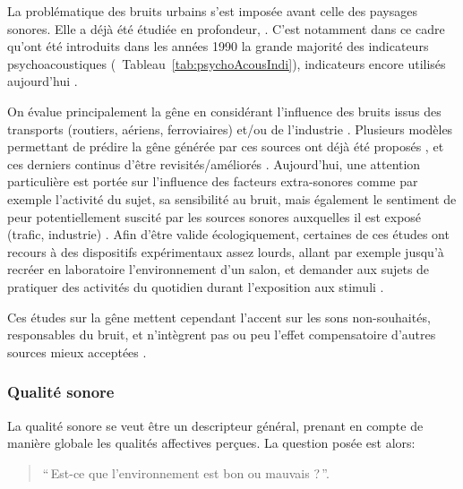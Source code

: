 {La problématique des bruits urbains s'est imposée avant celle des paysages sonores. Elle a déjà été étudiée en profondeur, \citep{marquis2005noisea,marquis2005noiseb}. C'est notamment dans ce cadre qu'ont été introduits dans les années 1990 la grande majorité des indicateurs psychoacoustiques \citep{zwicker2013psychoacoustics}(\cf~Tableau~\ref{tab:psychoAcousIndi}), indicateurs encore utilisés aujourd'hui \citep{hall2013exploratory,fiebig2009psychoacoustic,yang2013psychoacoustical}.


On évalue principalement la gêne en considérant l'influence des bruits issus des transports (routiers, aériens, ferroviaires) et/ou de l'industrie  \citep{gille2016noise,gille2016dose,trolle2015perception,klein2015spectral}. Plusieurs modèles permettant de prédire la gêne générée par ces sources ont déjà été proposés \citep{miedema2001annoyance,miedema2004relationship}, et ces derniers continus d'être revisités/améliorés \citep{gille2016testing}. Aujourd'hui, une attention particulière est portée sur l'influence des facteurs extra-sonores comme par exemple l'activité du sujet, sa sensibilité au bruit, mais également le sentiment de peur potentiellement suscité par les sources sonores auxquelles il est exposé (trafic, industrie) \citep{marquis2015simulated,morel2016noise}. Afin d'être valide écologiquement, certaines de ces études ont recours à des dispositifs expérimentaux assez lourds, allant par exemple jusqu'à recréer en laboratoire l'environnement d'un salon, et demander aux sujets de pratiquer des activités du quotidien durant l'exposition aux stimuli \citep{marquis2015simulated}.

Ces études sur la gêne mettent cependant l'accent sur les sons non-souhaités, responsables du bruit, et n'intègrent pas ou peu l'effet compensatoire d'autres sources mieux acceptées \citep{aletta2016soundscape}.

\subsubsection{Qualité sonore}

La qualité sonore se veut être un descripteur général, prenant en compte de manière globale les qualités affectives perçues. La question posée est alors:

\begin{quote}
``\,Est-ce que l'environnement est bon ou mauvais ?\,''.
\end{quote}

}
